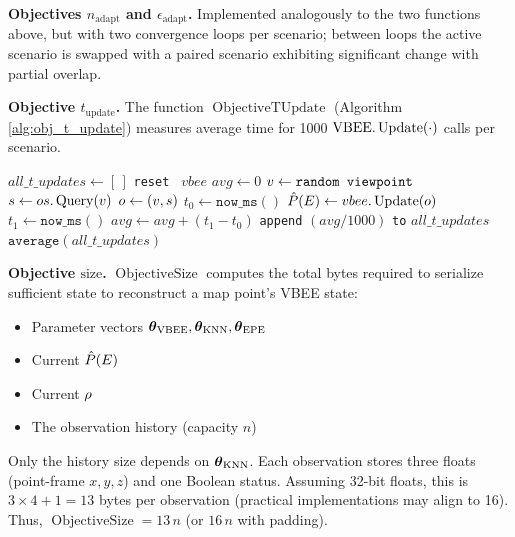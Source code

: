 \noindent\textbf{Objectives \(n_{\text{adapt}}\) and \(\epsilon_{\text{adapt}}\).} Implemented analogously to the two functions above, but with two convergence loops per scenario; between loops the active scenario is swapped with a paired scenario exhibiting significant change with partial overlap.

\noindent\textbf{Objective \(t_{\text{update}}\).} The function \(\operatorname{ObjectiveTUpdate}\) (Algorithm \ref{alg:obj_t_update}) measures average time for 1000 \(\text{VBEE}.\operatorname{Update}(\cdot)\) calls per scenario.

\begin{singlespace}
\begin{algorithm}[H]
    \caption[Objective Function: $t_{\text{update}}$]{ObjectiveTUpdate}
    \label{alg:obj_t_update}
    \begin{algorithmic}
            \State $all\_t\_updates \gets [\,]$
                \State \texttt{reset } $vbee$
                \State $avg \gets 0$
                    \State $v \gets \texttt{random viewpoint}$
                    \State $s \gets os.\operatorname{Query}(v)$
                    \State $o \gets (v,s)$
                    \State $t_0 \gets \texttt{now\_ms}()$
                    \State $\hat{P}(E) \gets vbee.\operatorname{Update}(o)$
                    \State $t_1 \gets \texttt{now\_ms}()$
                    \State $avg \gets avg + (t_1 - t_0)$
                \EndFor
                \State \texttt{append} $(avg / 1000)$ \texttt{to} $all\_t\_updates$
            \EndFor
            \State \Return $\texttt{average}(all\_t\_updates)$
        \EndFunction
    \end{algorithmic}
\end{algorithm}
\end{singlespace}

\noindent\textbf{Objective \(\text{size}\).} \(\operatorname{ObjectiveSize}\) computes the total bytes required to serialize sufficient state to reconstruct a map point’s VBEE state:
\begin{itemize}
    \item Parameter vectors \(\boldsymbol{\theta}_{\text{VBEE}},\boldsymbol{\theta}_{\text{KNN}},\boldsymbol{\theta}_{\text{EPE}}\)
    \item Current \(\hat{P}(E)\)
    \item Current \(\rho\)
    \item The \knn{} observation history (capacity \(n\))
\end{itemize}
Only the history size depends on \(\boldsymbol{\theta}_{\text{KNN}}\). Each observation stores three floats (point-frame \(x,y,z\)) and one Boolean status. Assuming 32-bit floats, this is \(3 \times 4 + 1 = 13\) bytes per observation (practical implementations may align to 16). Thus, \(\operatorname{ObjectiveSize} = 13\,n\) (or \(16\,n\) with padding).

